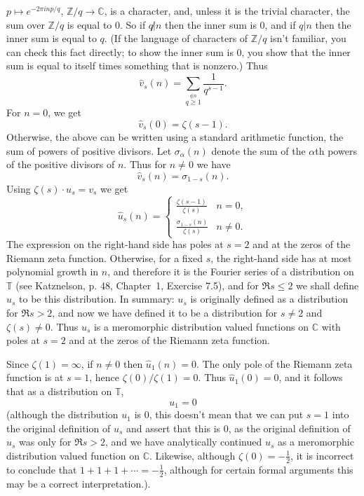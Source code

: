 \documentclass{article}
\begin{document}
 $p \mapsto e^{-2\pi inp/q}$, $\mathbb{Z}/q \to \mathbb{C}$, is a character, and, unless it is the trivial character, the sum over $\mathbb{Z}/q$ is equal to $0$.
So if $q \not | n$ then the inner sum is 0, and if $q | n$ then the inner sum is equal to $q$. (If the language of characters of $\mathbb{Z}/q$ isn't
familiar, you can check this fact directly; to show the inner sum is 0, you show that the inner sum is equal to itself times something that is nonzero.) Thus
\[
\widehat{v}_s(n)=\sum_{\stackrel{q|n}{q \geq 1}} \frac{1}{q^{s-1}}.
\]
For $n=0$, we get 
\[
\widehat{v}_s(0)=\zeta(s-1).
\]
Otherwise,
the above
can be written using a standard arithmetic function, the sum of powers of positive divisors. Let $\sigma_\alpha(n)$ denote the sum of the $\alpha$th
powers of the positive divisors of $n$. Thus for $n \neq 0$ we have
\[
\widehat{v}_s(n)=\sigma_{1-s}(n).
\]
Using $\zeta(s)\cdot u_s=v_s$ we get
\[
\widehat{u}_s(n)=
\begin{cases}
\frac{\zeta(s-1)}{\zeta(s)}&n=0,\\
\frac{\sigma_{1-s}(n)}{\zeta(s)}&n \neq 0.
\end{cases}
\]
The expression on the right-hand side  has poles at $s=2$ and at the zeros of the Riemann zeta function. Otherwise, for a fixed $s$, 
the right-hand side has at most polynomial growth in $n$, and therefore it is the Fourier series of a distribution on $\mathbb{T}$ (see
Katznelson, p. 48, Chapter~1, Exercise 7.5), and for $\Re s \leq 2$ we shall define $u_s$ to be this distribution. In summary: $u_s$ is originally defined as a distribution
for $\Re s > 2$, and now we have defined it to be a distribution for $s \neq 2$ and $\zeta(s) \neq 0$. Thus $u_s$ is a meromorphic distribution valued
functions
on $\mathbb{C}$ with poles at $s=2$ and at the zeros of the Riemann zeta function.

Since $\zeta(1)=\infty$, if $n \neq 0$ then $\widehat{u}_1(n)=0$.
The only pole of the Riemann zeta function is at $s=1$, hence $\zeta(0)/\zeta(1)=0$. Thus $\widehat{u}_1(0)=0$, and it follows that
as a distribution on $\mathbb{T}$,
\[
u_1=0
\]
 (although the distribution $u_1$ is $0$, this doesn't mean that we can put $s=1$ into the original definition of $u_s$ and assert that this is $0$, as the original
 definition of $u_s$ was 
only for $\Re s > 2$, and we have analytically continued $u_s$ as a meromorphic distribution valued function on $\mathbb{C}$. Likewise, although
$\zeta(0)=-\frac{1}{2}$, it is incorrect to conclude that $1+1+1+\cdots=-\frac{1}{2}$, although for certain formal arguments this may be a correct interpretation.). 
\end{document}
